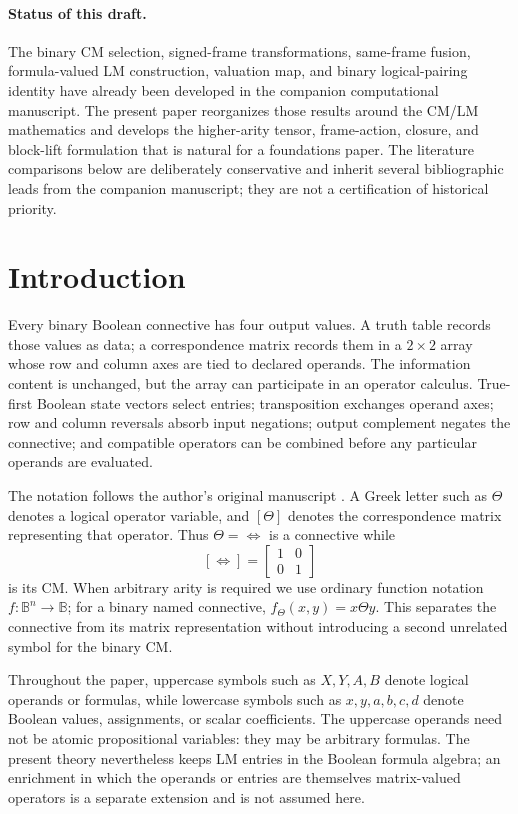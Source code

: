 \documentclass[11pt]{article}
\theoremstyle{definition}
\theoremstyle{remark}
\newcommand{\B}{\mathbb B}
\begin{document}
\paragraph{Status of this draft.}
The binary CM selection, signed-frame transformations, same-frame fusion, formula-valued LM construction, valuation map, and binary logical-pairing identity have already been developed in the companion computational manuscript.  The present paper reorganizes those results around the CM/LM mathematics and develops the higher-arity tensor, frame-action, closure, and block-lift formulation that is natural for a foundations paper.  The literature comparisons below are deliberately conservative and inherit several bibliographic leads from the companion manuscript; they are not a certification of historical priority.

\section{Introduction}

Every binary Boolean connective has four output values.  A truth table records those values as data; a correspondence matrix records them in a $2\times2$ array whose row and column axes are tied to declared operands.  The information content is unchanged, but the array can participate in an operator calculus.  True-first Boolean state vectors select entries; transposition exchanges operand axes; row and column reversals absorb input negations; output complement negates the connective; and compatible operators can be combined before any particular operands are evaluated.

The notation follows the author's original manuscript \cite{Droncheff2018}.  A Greek letter such as $\Theta$ denotes a logical operator variable, and $[\Theta]$ denotes the correspondence matrix representing that operator.  Thus $\Theta=\Leftrightarrow$ is a connective while
\[
 [\Leftrightarrow]=\begin{bmatrix}1&0\\0&1\end{bmatrix}
\]
is its CM.  When arbitrary arity is required we use ordinary function notation $f:\B^n\to\B$; for a binary named connective, $f_\Theta(x,y)=x\Theta y$.  This separates the connective from its matrix representation without introducing a second unrelated symbol for the binary CM.

Throughout the paper, uppercase symbols such as $X,Y,A,B$ denote logical operands or formulas, while lowercase symbols such as $x,y,a,b,c,d$ denote Boolean values, assignments, or scalar coefficients.  The uppercase operands need not be atomic propositional variables: they may be arbitrary formulas.  The present theory nevertheless keeps LM entries in the Boolean formula algebra; an enrichment in which the operands or entries are themselves matrix-valued operators is a separate extension and is not assumed here.
\end{document}
